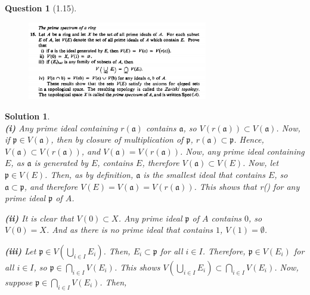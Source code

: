 \documentclass[11pt]{article}
\theoremstyle{plain}
\def\eQb#1\eQe{\begin{eqnarray*}#1\end{eqnarray*}}
\theoremstyle{quest}
\newtheorem*{question}{Question}
\newtheorem*{solution}{Solution}
\begin{document}
\begin{question}[1.15]
\hfill
\begin{figure}[h!]
  \centering
    \includegraphics[width=0.7\textwidth]{d-1-15.png}
\end{figure}
\end{question}
\begin{solution} \hfill \\
\textbf{(i)} Any prime ideal containing $r(\mathfrak{a})$ contains $\mathfrak{a}$,
so $V(r(\mathfrak{a})) \subset V(\mathfrak{a})$. Now, if $\mathfrak{p} \in 
V(\mathfrak{a})$, then by closure of multiplication of $\mathfrak{p}$, $r(\mathfrak{a}) 
\subset \mathfrak{p}$. Hence, $V(\mathfrak{a}) \subset V(r(\mathfrak{a}))$, and
$V(\mathfrak{a}) = V(r(\mathfrak{a}))$. Now, any prime ideal containing $E$,
as $\mathfrak{a}$ is generated by $E$, contains $E$, therefore $V(\mathfrak{a}) 
\subset V(E)$. Now, let $\mathfrak{p} \in V(E)$. Then, as by definition, $\mathfrak{a}$
is the smallest ideal that contains $E$, so $\mathfrak{a} \subset \mathfrak{p}$, 
and therefore $V(E) = V(\mathfrak{a}) = V(r(\mathfrak{a}))$. This shows that
\eQb
E \subset {} \iff {} \subset {} \iff 
r() \subset {}
\eQe
for any prime ideal $\mathfrak{p}$ of $A$. \\  

\smallskip 

\noindent \textbf{(ii)} It is clear that $V(0) \subset X$. Any prime ideal $\mathfrak{p}$
of $A$ contains $0$, so $V(0) = X$. And as there is no prime ideal that contains
$1$, $V(1) = \emptyset$.  


\smallskip

\noindent \textbf{(iii)} Let $\mathfrak{p} \in V(\bigcup_{i \in I} E_i)$. Then,
$E_i \subset \mathfrak{p}$ for all $i \in I$. Therefore,
$\mathfrak{p} \in V(E_i)$ for all $i \in I$, so $\mathfrak{p} \in \bigcap_{i \in I}
V(E_i)$. This shows $V(\bigcup_{i \in I} E_i ) \subset \bigcap_{i \in I} 
V(E_i)$. Now, suppose $\mathfrak{p} \in \bigcap_{i \in I} V(E_i)$. Then,  
 


\end{solution}
\end{document}
